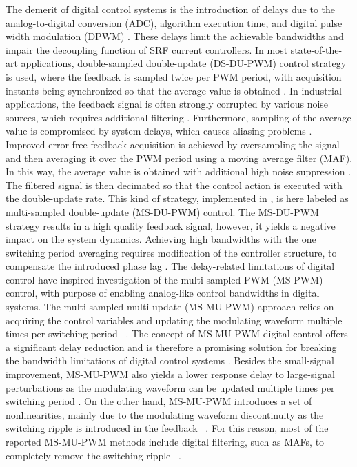 \documentclass[conference]{IEEEtran}
\begin{document}
The demerit of digital control systems is the introduction of delays due to the analog-to-digital conversion (ADC), algorithm execution time, and digital pulse width modulation (DPWM) \cite{Buso2015}. These delays limit the achievable bandwidths and impair the decoupling function of SRF current controllers. 
In most state-of-the-art applications, double-sampled double-update (DS-DU-PWM) control strategy is used, where the feedback is sampled twice per PWM period, with acquisition instants being synchronized so that the average value is obtained \cite{Buso2015}. In industrial applications, the feedback signal is often strongly corrupted by various noise sources, which requires additional filtering \cite{vuksa2016}. Furthermore, sampling of the average value is compromised by system delays, which causes aliasing problems \cite{Buso2015}.
Improved error-free feedback acquisition is achieved by oversampling the signal and then averaging it over the PWM period using a moving average filter (MAF). In this way, the average value is obtained with additional high noise suppression \cite{vuksa2016,Petric2020}. The filtered signal is then decimated so that the control action is executed with the double-update rate. This kind of strategy, implemented in \cite{vuksa2016}, is here labeled as multi-sampled double-update (MS-DU-PWM) control. The MS-DU-PWM strategy results in a high quality feedback signal, however, it yields a negative impact on the system dynamics. Achieving high bandwidths with the one switching period averaging requires modification of the controller structure, to compensate the introduced phase lag \cite{vuksa2016}.
The delay-related limitations of digital control have inspired investigation of the multi-sampled PWM (MS-PWM) control, with purpose of enabling analog-like control bandwidths in digital systems. The multi-sampled multi-update (MS-MU-PWM) approach relies on acquiring the control variables and updating the modulating waveform multiple times per switching period ~\cite{corradini2018,corradini_analysis,rovere2018,Restrepo2019,Petric2020,Petric2021,Petric2021b,Ito2021,He2021}. The concept of MS-MU-PWM digital control offers a significant delay reduction and is therefore a promising solution for breaking the bandwidth limitations of digital control systems \cite{corradini2018}. Besides the small-signal improvement, MS-MU-PWM also yields a lower response delay to large-signal perturbations as the modulating waveform can be updated multiple times per switching period \cite{Buso2016}. On the other hand, MS-MU-PWM introduces a set of nonlinearities, mainly due to the modulating waveform discontinuity as the switching ripple is introduced in the feedback ~\cite{corradini2018,Petric2021,Petric2021b}. For this reason, most of the reported MS-MU-PWM methods include digital filtering, such as MAFs, to completely remove the switching ripple ~\cite{Restrepo2019,He2021}.
\end{document}
